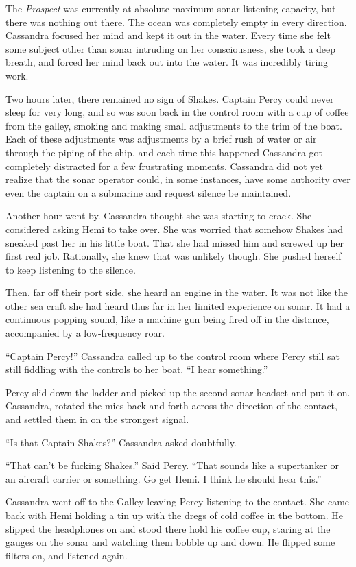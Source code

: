 \documentclass[
]{scrbook}
\begin{document}
The \emph{Prospect} was currently at absolute maximum sonar listening
capacity, but there was nothing out there. The ocean was completely
empty in every direction. Cassandra focused her mind and kept it out in
the water. Every time she felt some subject other than sonar intruding
on her consciousness, she took a deep breath, and forced her mind back
out into the water. It was incredibly tiring work.

Two hours later, there remained no sign of Shakes. Captain Percy could
never sleep for very long, and so was soon back in the control room with
a cup of coffee from the galley, smoking and making small adjustments to
the trim of the boat. Each of these adjustments was adjustments by a
brief rush of water or air through the piping of the ship, and each time
this happened Cassandra got completely distracted for a few frustrating
moments. Cassandra did not yet realize that the sonar operator could, in
some instances, have some authority over even the captain on a submarine
and request silence be maintained.

Another hour went by. Cassandra thought she was starting to crack. She
considered asking Hemi to take over. She was worried that somehow Shakes
had sneaked past her in his little boat. That she had missed him and
screwed up her first real job. Rationally, she knew that was unlikely
though. She pushed herself to keep listening to the silence.

Then, far off their port side, she heard an engine in the water. It was
not like the other sea craft she had heard thus far in her limited
experience on sonar. It had a continuous popping sound, like a machine
gun being fired off in the distance, accompanied by a low-frequency
roar.

``Captain Percy!'' Cassandra called up to the control room where Percy
still sat still fiddling with the controls to her boat. ``I hear
something.''

Percy slid down the ladder and picked up the second sonar headset and
put it on. Cassandra, rotated the mics back and forth across the
direction of the contact, and settled them in on the strongest signal.

``Is that Captain Shakes?'' Cassandra asked doubtfully.

``That can't be fucking Shakes.'' Said Percy. ``That sounds like a
supertanker or an aircraft carrier or something. Go get Hemi. I think he
should hear this.''

Cassandra went off to the Galley leaving Percy listening to the contact.
She came back with Hemi holding a tin up with the dregs of cold coffee
in the bottom. He slipped the headphones on and stood there hold his
coffee cup, staring at the gauges on the sonar and watching them bobble
up and down. He flipped some filters on, and listened again.
\end{document}
